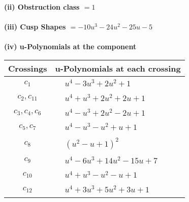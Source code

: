 \documentclass[1p]{elsarticle_modified}
\theoremstyle{definition}
\begin{document}
\flushleft \textbf{(ii) Obstruction class $= 1$}\\~\\
\flushleft \textbf{(iii) Cusp Shapes $= -10 u^3-24 u^2-25 u-5$}\\~\\
\newpage\renewcommand{\arraystretch}{1}
\flushleft \textbf{(iv) u-Polynomials at the component}\newline \\
\begin{tabular}{m{50pt}|m{274pt}}
Crossings & \hspace{64pt}u-Polynomials at each crossing \\
\hline $$\begin{aligned}c_{1}\end{aligned}$$&$\begin{aligned}
&u^4-3 u^3+2 u^2+1
\end{aligned}$\\
\hline $$\begin{aligned}c_{2},c_{11}\end{aligned}$$&$\begin{aligned}
&u^4+u^3+2 u^2+2 u+1
\end{aligned}$\\
\hline $$\begin{aligned}c_{3},c_{4},c_{6}\end{aligned}$$&$\begin{aligned}
&u^4- u^3+2 u^2-2 u+1
\end{aligned}$\\
\hline $$\begin{aligned}c_{5},c_{7}\end{aligned}$$&$\begin{aligned}
&u^4- u^3- u^2+u+1
\end{aligned}$\\
\hline $$\begin{aligned}c_{8}\end{aligned}$$&$\begin{aligned}
&(u^2- u+1)^2
\end{aligned}$\\
\hline $$\begin{aligned}c_{9}\end{aligned}$$&$\begin{aligned}
&u^4-6 u^3+14 u^2-15 u+7
\end{aligned}$\\
\hline $$\begin{aligned}c_{10}\end{aligned}$$&$\begin{aligned}
&u^4+u^3- u^2- u+1
\end{aligned}$\\
\hline $$\begin{aligned}c_{12}\end{aligned}$$&$\begin{aligned}
&u^4+3 u^3+5 u^2+3 u+1
\end{aligned}$\\
\hline
\end{tabular}\\~\\
\end{document}
